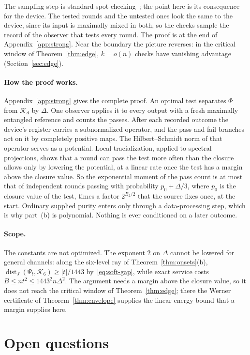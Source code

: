 \documentclass[11pt]{article}
\theoremstyle{definition}
\theoremstyle{remark}
\DeclareMathOperator{\dist}{dist}
\newcommand{\K}{\mathcal K}
\begin{document}
The sampling step is standard spot-checking~\cite{BoumanFehr}; the point here is its consequence for the device. The tested rounds and the untested ones look the same to the device, since its input is maximally mixed in both, so the checks sample the record of the observer that tests every round. The proof is at the end of Appendix~\ref{app:strong}. Near the boundary the picture reverses: in the critical window of Theorem~\ref{thm:edge}, $k=o(n)$ checks have vanishing advantage (Section~\ref{sec:edge}).

\paragraph{How the proof works.}
Appendix~\ref{app:strong} gives the complete proof. An optimal test separates $\Phi$ from $\K_d$ by $\Delta$. One observer applies it to every output with a fresh maximally entangled reference and counts the passes. After each recorded outcome the device's register carries a subnormalized operator, and the pass and fail branches act on it by completely positive maps. The Hilbert--Schmidt norm of that operator serves as a potential. Local tracialization, applied to spectral projections, shows that a round can pass the test more often than the closure allows only by lowering the potential, at a linear rate once the test has a margin above the closure value. So the exponential moment of the pass count is at most that of independent rounds passing with probability $p_0+\Delta/3$, where $p_0$ is the closure value of the test, times a factor $2^{B_2/2}$ that the source fixes once, at the start. Ordinary supplied purity enters only through a data-processing step, which is why part~(b) is polynomial. Nothing is ever conditioned on a later outcome.

\paragraph{Scope.}
The constants are not optimized. The exponent $2$ on $\Delta$ cannot be lowered for general channels: along the six-level ray of Theorem~\ref{thm:onsets}(b), $\dist_J(\Psi_t,\K_6)\ge|t|/1443$ by~\eqref{eq:soft-gap}, while exact service costs $B\le nt^2\le1443^2n\Delta^2$. The argument needs a margin above the closure value, so it does not reach the critical window of Theorem~\ref{thm:edge}; there the Werner certificate of Theorem~\ref{thm:envelope} supplies the linear energy bound that a margin supplies here.


\section{Open questions}\label{sec:open}
\end{document}
